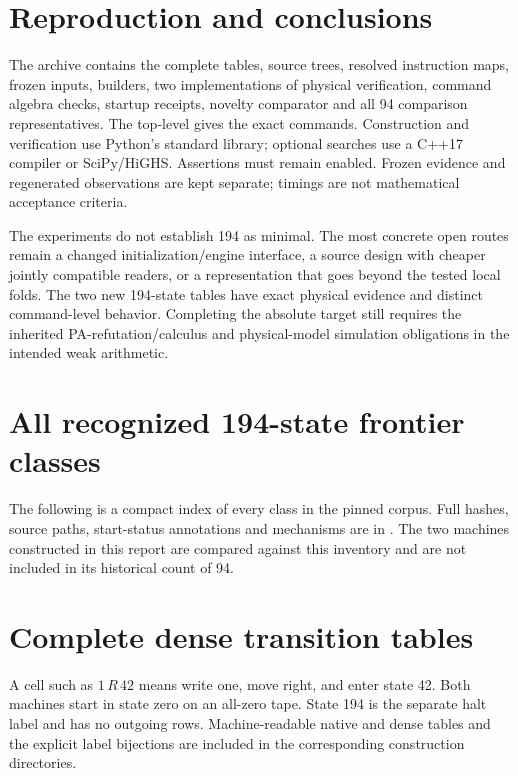 \documentclass[11pt]{article}
\theoremstyle{definition}\newtheorem{definition}[theorem]{Definition}
\begin{document}


\section{Reproduction and conclusions}

The archive contains the complete tables, source trees, resolved instruction
maps, frozen inputs, builders, two implementations of physical verification,
command algebra checks, startup receipts, novelty comparator and all 94
comparison representatives. The top-level  gives the exact
commands. Construction and verification use Python's standard library;
optional searches use a C++17 compiler or SciPy/HiGHS. Assertions must
remain enabled. Frozen evidence and regenerated observations are kept
separate; timings are not mathematical acceptance criteria.

The experiments do not establish 194 as minimal. The most concrete open
routes remain a changed initialization/engine interface, a source design
with cheaper jointly compatible readers, or a representation that goes
beyond the tested local folds. The two new 194-state tables have exact
physical evidence and distinct command-level behavior. Completing the
absolute target still requires the inherited PA-refutation/calculus and
physical-model simulation obligations in the intended weak arithmetic.

\appendix
\section{All recognized 194-state frontier classes}
\label{app:frontier}

The following is a compact index of every class in the pinned corpus.
Full hashes, source paths, start-status annotations and mechanisms are in
. The two machines constructed
in this report are compared against this inventory and are not included
in its historical count of 94.
\begingroup\small\endgroup

\section{Complete dense transition tables}
\label{app:tables}

A cell such as $1\,R\,42$ means write one, move right, and enter state 42.
Both machines start in state zero on an all-zero tape. State 194 is the
separate halt label and has no outgoing rows. Machine-readable native
and dense tables and the explicit label bijections are included in the
corresponding construction directories.

\end{document}
